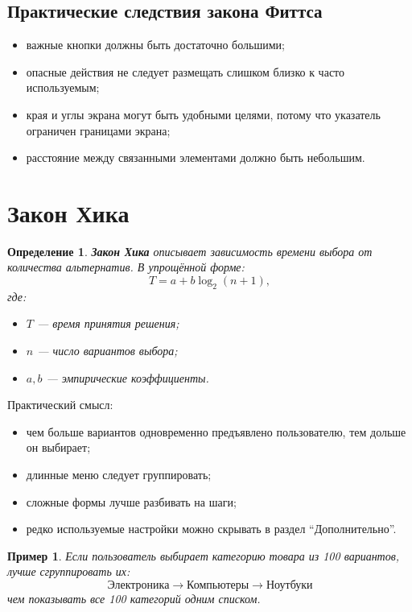 \documentclass[12pt,a4paper]{article}
\newtheorem{definition}{Определение}
\newtheorem{example}{Пример}
\begin{document}
\subsection{Практические следствия закона Фиттса}

\begin{itemize}
    \item важные кнопки должны быть достаточно большими;
    \item опасные действия не следует размещать слишком близко к часто используемым;
    \item края и углы экрана могут быть удобными целями, потому что указатель ограничен границами экрана;
    \item расстояние между связанными элементами должно быть небольшим.
\end{itemize}

\section{Закон Хика}

\begin{definition}
\textbf{Закон Хика} описывает зависимость времени выбора от количества альтернатив. В упрощённой форме:
\[
T = a + b \log_2(n + 1),
\]
где:
\begin{itemize}
    \item $T$ --- время принятия решения;
    \item $n$ --- число вариантов выбора;
    \item $a,b$ --- эмпирические коэффициенты.
\end{itemize}
\end{definition}

Практический смысл:
\begin{itemize}
    \item чем больше вариантов одновременно предъявлено пользователю, тем дольше он выбирает;
    \item длинные меню следует группировать;
    \item сложные формы лучше разбивать на шаги;
    \item редко используемые настройки можно скрывать в раздел ``Дополнительно''.
\end{itemize}

\begin{example}
Если пользователь выбирает категорию товара из 100 вариантов, лучше сгруппировать их:
\[
\text{Электроника} \rightarrow \text{Компьютеры} \rightarrow \text{Ноутбуки}
\]
чем показывать все 100 категорий одним списком.
\end{example}
\end{document}
